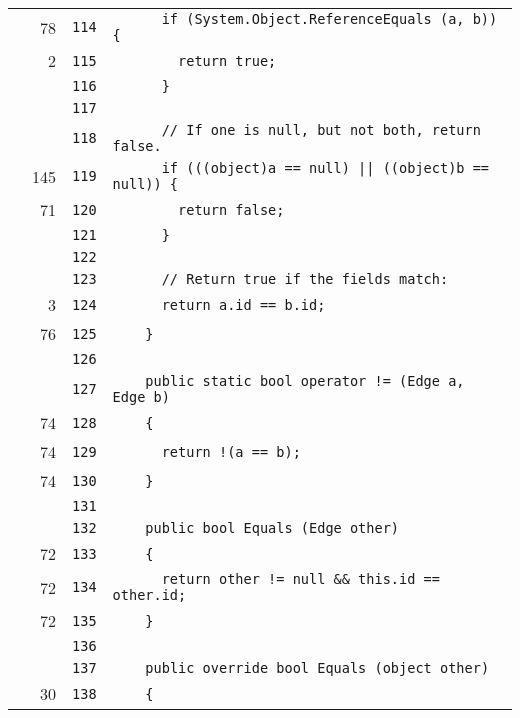 \documentclass[a4paper,10pt]{article}
\begin{document}
\begin{longtable}[l]{lrrl}
\cellcolor{green} & 78 & \verb~114~ & \verb~      if (System.Object.ReferenceEquals (a, b)) {~\\
\cellcolor{green} & 2 & \verb~115~ & \verb~        return true;~\\
\cellcolor{gray} &  & \verb~116~ & \verb~      }~\\
\cellcolor{gray} &  & \verb~117~ & \verb~~\\
\cellcolor{gray} &  & \verb~118~ & \verb~      // If one is null, but not both, return false.~\\
\cellcolor{green} & 145 & \verb~119~ & \verb~      if (((object)a == null) || ((object)b == null)) {~\\
\cellcolor{green} & 71 & \verb~120~ & \verb~        return false;~\\
\cellcolor{gray} &  & \verb~121~ & \verb~      }~\\
\cellcolor{gray} &  & \verb~122~ & \verb~~\\
\cellcolor{gray} &  & \verb~123~ & \verb~      // Return true if the fields match:~\\
\cellcolor{green} & 3 & \verb~124~ & \verb~      return a.id == b.id;~\\
\cellcolor{green} & 76 & \verb~125~ & \verb~    }~\\
\cellcolor{gray} &  & \verb~126~ & \verb~~\\
\cellcolor{gray} &  & \verb~127~ & \verb~    public static bool operator != (Edge a, Edge b)~\\
\cellcolor{green} & 74 & \verb~128~ & \verb~    {~\\
\cellcolor{green} & 74 & \verb~129~ & \verb~      return !(a == b);~\\
\cellcolor{green} & 74 & \verb~130~ & \verb~    }~\\
\cellcolor{gray} &  & \verb~131~ & \verb~~\\
\cellcolor{gray} &  & \verb~132~ & \verb~    public bool Equals (Edge other)~\\
\cellcolor{green} & 72 & \verb~133~ & \verb~    {~\\
\cellcolor{green} & 72 & \verb~134~ & \verb~      return other != null && this.id == other.id;~\\
\cellcolor{green} & 72 & \verb~135~ & \verb~    }~\\
\cellcolor{gray} &  & \verb~136~ & \verb~~\\
\cellcolor{gray} &  & \verb~137~ & \verb~    public override bool Equals (object other)~\\
\cellcolor{green} & 30 & \verb~138~ & \verb~    {~\\

\end{longtable}
\end{document}

